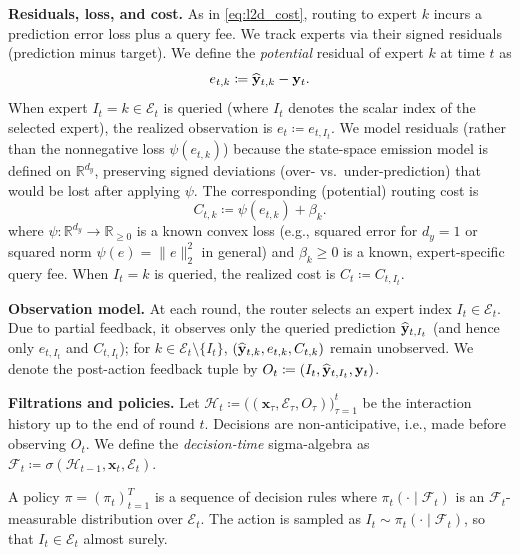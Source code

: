 \textbf{Residuals, loss, and cost.}
As in \eqref{eq:l2d_cost}, routing to expert \(k\) incurs a prediction error loss plus a query fee.
We track experts via their signed residuals (prediction minus target). We define the \emph{potential}
residual of expert \(k\) at time \(t\) as
\begin{equation}
\label{eq:residual}
  e_{t,k} \coloneqq \widehat{\mathbf{y}}_{t,k}-\mathbf{y}_t .
\end{equation}
When expert \(I_t=k\in\mathcal{E}_t\) is queried (where \(I_t\) denotes the scalar index of the selected expert), the realized observation is \(e_t\coloneqq e_{t,I_t}\).
We model residuals (rather than the nonnegative loss \(\psi(e_{t,k})\)) because the state-space
emission model is defined on \(\mathbb{R}^{d_y}\), preserving signed deviations (over- vs.\ under-prediction)
that would be lost after applying \(\psi\).
The corresponding (potential) routing cost is
\begin{equation}
\label{eq:routing_cost}
  C_{t,k} \coloneqq \psi(e_{t,k}) + \beta_k .
\end{equation}
where \(\psi:\mathbb{R}^{d_y}\to\mathbb{R}_{\ge 0}\) is a known convex loss (e.g., squared error for
\(d_y=1\) or squared norm \(\psi(e)=\lVert e\rVert_2^2\) in general) and \(\beta_k\ge 0\) is a known,
expert-specific query fee. When \(I_t=k\) is queried, the realized cost is \(C_t\coloneqq C_{t,I_t}\).

\textbf{Observation model.}
At each round, the router selects an expert index \(I_t\in\mathcal{E}_t\). Due to partial
feedback, it observes only the queried prediction \(\widehat{\mathbf{y}}_{t,I_t}\) (and hence only
\(e_{t,I_t}\) and \(C_{t,I_t}\)); for \(k\in\mathcal{E}_t\setminus\{I_t\}\),
\((\widehat{\mathbf{y}}_{t,k},e_{t,k},C_{t,k})\) remain
unobserved. We denote the post-action feedback tuple by \(O_t \coloneqq (I_t,\widehat{\mathbf{y}}_{t,I_t},\mathbf{y}_t)\).

\textbf{Filtrations and policies.}
Let \(\mathcal{H}_{t}\coloneqq \big((\mathbf{x}_\tau,\mathcal{E}_\tau,O_\tau)\big)_{\tau=1}^{t}\)
be the interaction history up to the end of round \(t\).
Decisions are non-anticipative, i.e., made before observing \(O_t\).
We define the \emph{decision-time} sigma-algebra as $\mathcal{F}_t \coloneqq
\sigma\left(\mathcal{H}_{t-1},\mathbf{x}_t,\mathcal{E}_t\right)$.

A policy \(\pi=(\pi_t)_{t=1}^T\) is a sequence of decision rules where
\(\pi_t(\cdot \mid \mathcal{F}_t)\) is an \(\mathcal{F}_t\)-measurable distribution over
\(\mathcal{E}_t\).
The action is sampled as \(I_t \sim \pi_t(\cdot \mid \mathcal{F}_t)\), so that
\(I_t\in\mathcal{E}_t\) almost surely.

